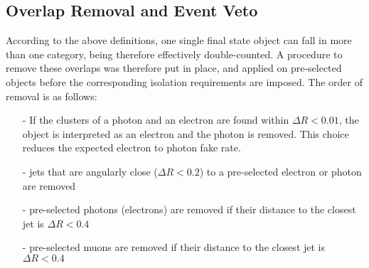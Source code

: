 %
%
%

\subsection{Overlap Removal and Event Veto}
\label{sec:overlap_romoval_event_veto}

According to the above definitions, one single final state object can
fall in more than one category, being therefore effectively double-counted. A procedure to remove
these overlaps was therefore put in place, and applied on pre-selected objects before the corresponding
isolation requirements are imposed. The order of removal is as follows:

\begin{itemize}\itemsep0.1cm
\item[-] If the clusters of a photon and an electron are found within $\Delta R < 0.01$, the object is interpreted as an electron and the
  photon is removed. This choice reduces the expected electron to photon fake rate.
\item[-] jets that are angularly close ($\Delta R<0.2$) to a pre-selected electron or photon are removed
\item[-] pre-selected photons (electrons) are removed if their distance to the closest jet is $\Delta R < 0.4$
\item[-] pre-selected muons are removed if their distance to the closest jet is $\Delta R < 0.4$
\end{itemize}

